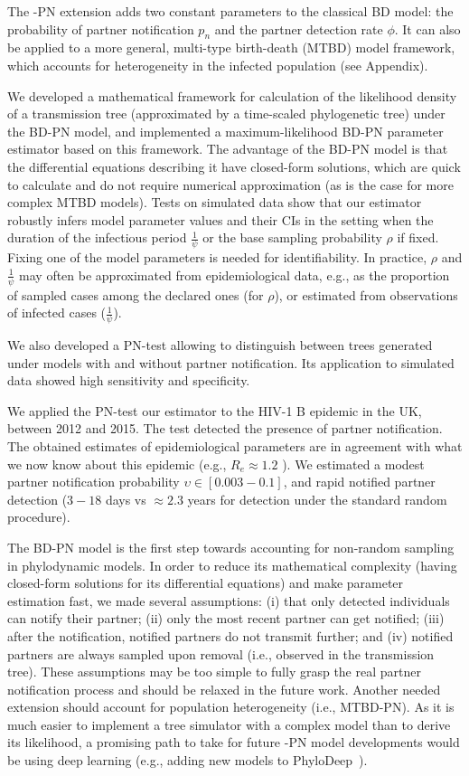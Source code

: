 \documentclass[a4paper,10pt]{article}
\begin{document}
The -PN extension adds two constant parameters to the classical BD model: the probability of partner notification $p_n$ and the partner detection rate $\phi$. It can also be applied to a more general, multi-type birth-death (MTBD) model framework, which accounts for heterogeneity in the infected population (see Appendix). 

We developed a mathematical framework for calculation of the likelihood density of a transmission tree (approximated by a time-scaled phylogenetic tree) under the BD-PN model, and implemented a maximum-likelihood BD-PN parameter estimator based on this framework. The advantage of the BD-PN model is that the differential equations describing it have closed-form solutions, which are quick to calculate and do not require numerical approximation (as is the case for more complex MTBD models). Tests on simulated data show that our estimator robustly infers model parameter values and their CIs in the setting when the duration of the infectious period $\frac{1}{\psi}$ or the base sampling probability $\rho$ if fixed. Fixing one of the model parameters is needed for identifiability. In practice, $\rho$ and $\frac{1}{\psi}$ may often be approximated from epidemiological data, e.g., as the proportion of sampled cases among the declared ones (for $\rho$), or estimated from observations of infected cases ($\frac{1}{\psi}$). 

We also developed a PN-test allowing to distinguish between trees generated under models with and without partner notification. Its application to simulated data showed high sensitivity and specificity. 

We applied the PN-test our estimator to the HIV-1 B epidemic in the UK, between 2012 and 2015. The test detected the presence of partner notification. The obtained estimates of epidemiological parameters are in agreement with what we now know about this epidemic (e.g., $R_e \approx 1.2$ ). We estimated a modest partner notification probability $\upsilon \in [0.003-0.1]$, and rapid notified partner detection ($3-18$ days vs $\approx2.3$ years for detection under the standard random procedure).

The BD-PN model is the first step towards accounting for non-random sampling in phylodynamic models. In order to reduce its mathematical complexity (having closed-form solutions for its differential equations) and make parameter estimation fast, we made several assumptions: (i) that only detected individuals can notify their partner; (ii) only the most recent partner can get notified; (iii) after the notification, notified partners do not transmit further; and (iv) notified partners are always sampled upon removal (i.e., observed in the transmission tree). These assumptions may be too simple to fully grasp the real partner notification process and should be relaxed in the future work. Another needed extension should account for population heterogeneity (i.e., MTBD-PN). As it is much easier to implement a tree simulator with a complex model than to derive its likelihood, a promising path to take for future -PN model developments would be using deep learning (e.g., adding new models to PhyloDeep~\citep{Voznica2021}). 
\end{document}
